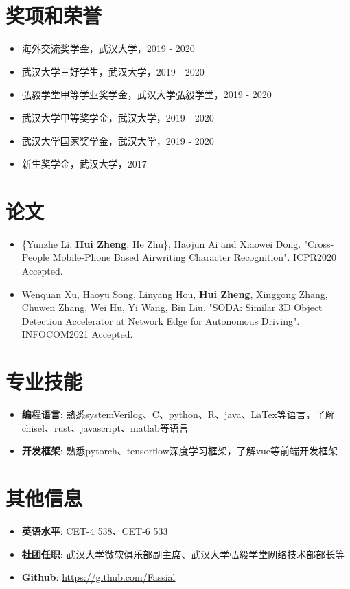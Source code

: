 \documentclass{resume}
\begin{document}
\section{{\bfseries 奖项和荣誉}}
\begin{itemize}[parsep=0.2ex]
	\item 海外交流奖学金，武汉大学，2019 - 2020
	\item 武汉大学三好学生，武汉大学，2019 - 2020
	\item 弘毅学堂甲等学业奖学金，武汉大学弘毅学堂，2019 - 2020
	\item 武汉大学甲等奖学金，武汉大学，2019 - 2020
	\item 武汉大学国家奖学金，武汉大学，2019 - 2020
	\item 新生奖学金，武汉大学，2017
\end{itemize}

\section{{\bfseries 论文}}
\begin{itemize}[parsep=0.2ex]
	\item \{Yunzhe Li, \textbf{Hui Zheng}, He Zhu\}, Haojun Ai and Xiaowei Dong. "Cross-People Mobile-Phone Based Airwriting Character Recognition". ICPR2020 Accepted.
	\item Wenquan Xu, Haoyu Song, Linyang Hou, \textbf{Hui Zheng}, Xinggong Zhang, Chuwen Zhang, Wei Hu, Yi Wang, Bin Liu. "SODA: Similar 3D Object Detection Accelerator at Network Edge for Autonomous Driving". INFOCOM2021 Accepted.
\end{itemize}

\section{{\bfseries 专业技能}}
\begin{itemize}[parsep=0.2ex]
	\item \textbf{编程语言}: 熟悉systemVerilog、C、python、R、java、LaTex等语言，了解chisel、rust、javascript、matlab等语言
	\item \textbf{开发框架}: 熟悉pytorch、tensorflow深度学习框架，了解vue等前端开发框架
\end{itemize}

\section{{\bfseries 其他信息}}
\begin{itemize}[parsep=0.2ex]
	\item \textbf{英语水平}: CET-4 538、CET-6 533
	\item \textbf{社团任职}: 武汉大学微软俱乐部副主席、武汉大学弘毅学堂网络技术部部长等
	\item \textbf{Github}: \href{https://github.com/Fassial}{https://github.com/Fassial}
\end{itemize}
\end{document}
